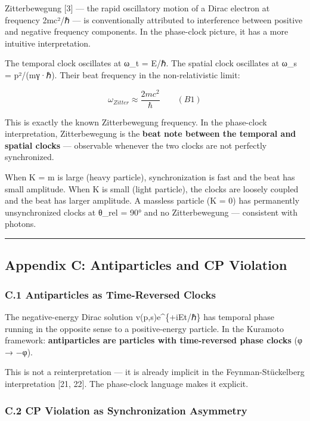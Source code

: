 \documentclass[
]{article}
\begin{document}
Zitterbewegung {[}3{]} --- the rapid oscillatory motion of a Dirac
electron at frequency 2mc²/ℏ --- is conventionally attributed to
interference between positive and negative frequency components. In the
phase-clock picture, it has a more intuitive interpretation.

The temporal clock oscillates at ω\_t = E/ℏ. The spatial clock
oscillates at ω\_s = p²/(mγ·ℏ). Their beat frequency in the
non-relativistic limit:

\[\omega_{Zitter} \approx \frac{2mc^2}{\hbar} \qquad (B1)\]

This is exactly the known Zitterbewegung frequency. In the phase-clock
interpretation, Zitterbewegung is the \textbf{beat note between the
temporal and spatial clocks} --- observable whenever the two clocks are
not perfectly synchronized.

When K = m is large (heavy particle), synchronization is fast and the
beat has small amplitude. When K is small (light particle), the clocks
are loosely coupled and the beat has larger amplitude. A massless
particle (K = 0) has permanently unsynchronized clocks at θ\_rel = 90°
and no Zitterbewegung --- consistent with photons.

\begin{center}\rule{0.5\linewidth}{0.5pt}\end{center}

\subsection{Appendix C: Antiparticles and CP
Violation}\label{appendix-c-antiparticles-and-cp-violation}

\subsubsection{C.1 Antiparticles as Time-Reversed
Clocks}\label{c.1-antiparticles-as-time-reversed-clocks}

The negative-energy Dirac solution v(p,s)e\^{}\{+iEt/ℏ\} has temporal
phase running in the opposite sense to a positive-energy particle. In
the Kuramoto framework: \textbf{antiparticles are particles with
time-reversed phase clocks} (φ → −φ).

This is not a reinterpretation --- it is already implicit in the
Feynman-Stückelberg interpretation {[}21, 22{]}. The phase-clock
language makes it explicit.

\subsubsection{C.2 CP Violation as Synchronization
Asymmetry}\label{c.2-cp-violation-as-synchronization-asymmetry}
\end{document}
